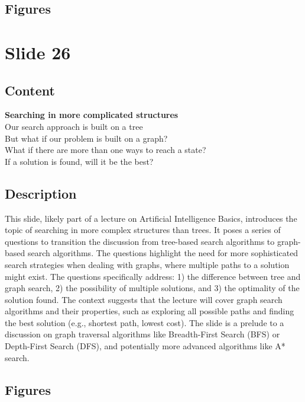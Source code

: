 \documentclass{article}%
\begin{document}
\subsection{Figures}%
\begin{figure}[H]%
\centering%
\end{figure}

%
\newpage%
\section{Slide 26}%
\label{sec:Slide26}%
\subsection{Content}%

\textbf{Searching in more complicated structures} \\
Our search approach is built on a tree \\
But what if our problem is built on a graph? \\
What if there are more than one ways to reach a state? \\
If a solution is found, will it be the best?
%
\subsection{Description}%
This slide, likely part of a lecture on Artificial Intelligence Basics, introduces the topic of searching in more complex structures than trees.  It poses a series of questions to transition the discussion from tree-based search algorithms to graph-based search algorithms.  The questions highlight the need for more sophisticated search strategies when dealing with graphs, where multiple paths to a solution might exist.  The questions specifically address: 1) the difference between tree and graph search, 2) the possibility of multiple solutions, and 3) the optimality of the solution found.  The context suggests that the lecture will cover graph search algorithms and their properties, such as exploring all possible paths and finding the best solution (e.g., shortest path, lowest cost).  The slide is a prelude to a discussion on graph traversal algorithms like Breadth-First Search (BFS) or Depth-First Search (DFS), and potentially more advanced algorithms like A* search.%
\subsection{Figures}%
\begin{figure}[H]%
\centering%
\end{figure}
\end{document}
